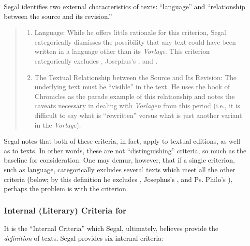 Segal identifies two external characteristics of \rwb texts: ``language'' and ``relationship between the source and its revision.'' 
\begin{quote}
\begin{enumerate}
    \item Language: While he offers little rationale for this criterion, Segal categorically dismisses the possibility that any \rwb text could have been written in a language other than its \emph{Vorlage}. This criterion categorically excludes \ga, Josephus's \ant, and \lab.

    \item The Textual Relationship between the Source and Its Revision: The underlying text must be ``visible'' in the \rwb text. He uses the book of Chronicles as the parade example of this relationship and notes the caveats necessary in dealing with \emph{Vorlagen} from this period (i.e., it is difficult to say what is ``rewritten'' versus what is just another variant in the \emph{Vorlage}).
\end{enumerate} 
\end{quote}
\noindent
Segal notes that both of these criteria, in fact, apply to textual editions, as well as to \rwb texts.%
    \autocite[20]{segal_henze2005}
In other words, these are not ``distinguishing'' criteria, so much as the baseline for consideration. One may demur, however, that if a single criterion, such as language, categorically excludes several texts which meet all the other criteria (below; by this definition he excludes \ga, Josephus's \ant, and Ps. Philo's \lab), perhaps the problem is with the criterion.

\subsubsection{Internal (Literary) Criteria for \rwb}

It is the ``Internal Criteria'' which Segal, ultimately, believes provide the \emph{definition} of \rwb texts.%
    \autocite[20]{segal_henze2005}
Segal provides six internal criteria: 

